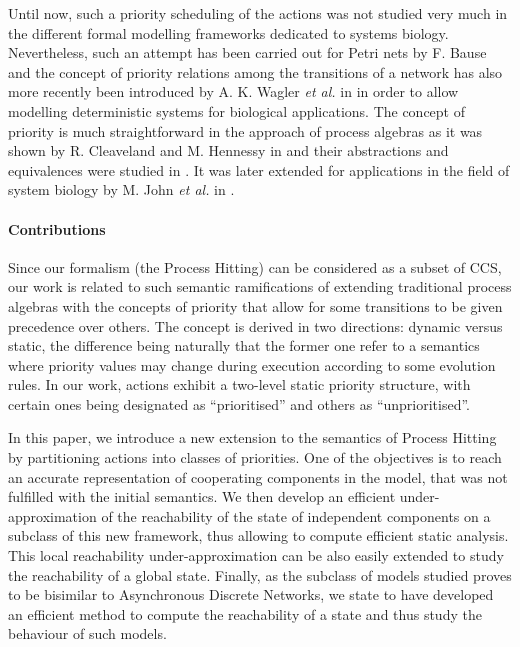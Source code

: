 Until now, such a priority scheduling of the actions was not studied very much in the different formal modelling frameworks dedicated to systems biology.
Nevertheless, such an attempt has been carried out for Petri nets by F. Bause \cite{Bause97}
and the concept of priority relations among the transitions of a network has also more recently been introduced by A. K. Wagler \textit{et al.} in \cite{waw,WaglerW12} in order to allow modelling deterministic systems for biological applications.
The concept of priority is much straightforward in the approach of process algebras as it was shown by R. Cleaveland and M. Hennessy in \cite{Cleaveland199058,Cleaveland99prioritiesin} and their abstractions and equivalences were studied in \cite{Cleaveland:2007:PAP:1282576.1282847}.
It was later extended for applications in the field of system biology by M. John \textit{et al.} in \cite{jlnu2010}.

\paragraph{Contributions}
Since our formalism (the Process Hitting) can be considered as a subset of CCS, %
our work is related to such semantic ramifications of extending traditional process algebras with the concepts of priority that allow for some transitions to be given precedence over others.
The concept is derived in two directions: dynamic versus static, the difference being naturally that the former one refer to a semantics where priority values may change during execution according to some evolution rules.
In our work, actions exhibit a two-level static priority structure, with certain ones being designated as “prioritised” and others as “unprioritised”.

In this paper, we introduce a new extension to the semantics of Process Hitting by partitioning actions into classes of priorities.
One of the objectives is to reach an accurate representation of cooperating components in the model, that was not fulfilled with the initial semantics.
We then develop an efficient under-approximation of the reachability of the state of independent components on a subclass of this new framework, thus allowing to compute efficient static analysis.
This local reachability under-approximation can be also easily extended to study the reachability of a global state.
Finally, as the subclass of models studied proves to be bisimilar to Asynchronous Discrete Networks, we state to have developed an efficient method to compute the reachability of a state and thus study the behaviour of such models.

